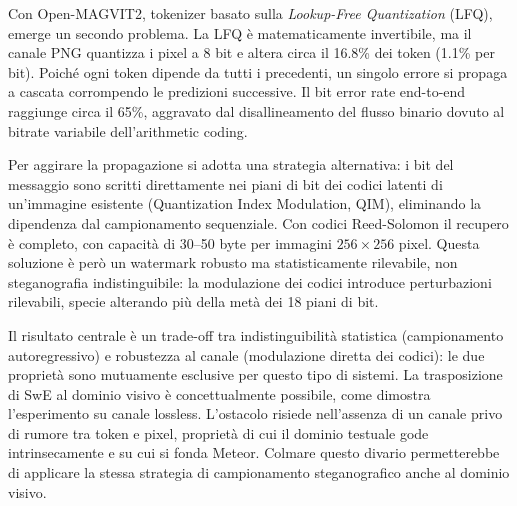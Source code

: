 \documentclass[a4paper, 11pt]{article}
\begin{document}
Con Open-MAGVIT2, tokenizer basato sulla \emph{Lookup-Free Quantization} (LFQ), emerge un secondo problema. La LFQ è matematicamente invertibile, ma il canale PNG quantizza i pixel a 8 bit e altera circa il 16.8\% dei token (1.1\% per bit). Poiché ogni token dipende da tutti i precedenti, un singolo errore si propaga a cascata corrompendo le predizioni successive. Il bit error rate end-to-end raggiunge circa il 65\%, aggravato dal disallineamento del flusso binario dovuto al bitrate variabile dell'arithmetic coding.

Per aggirare la propagazione si adotta una strategia alternativa: i bit del messaggio sono scritti direttamente nei piani di bit dei codici latenti di un'immagine esistente (Quantization Index Modulation, QIM), eliminando la dipendenza dal campionamento sequenziale. Con codici Reed-Solomon il recupero è completo, con capacità di 30--50 byte per immagini $256\times 256$ pixel. Questa soluzione è però un watermark robusto ma statisticamente rilevabile, non steganografia indistinguibile: la modulazione dei codici introduce perturbazioni rilevabili, specie alterando più della metà dei 18 piani di bit.

Il risultato centrale è un trade-off tra indistinguibilità statistica (campionamento autoregressivo) e robustezza al canale (modulazione diretta dei codici): le due proprietà sono mutuamente esclusive per questo tipo di sistemi. La trasposizione di SwE al dominio visivo è concettualmente possibile, come dimostra l'esperimento su canale lossless. L'ostacolo risiede nell'assenza di un canale privo di rumore tra token e pixel, proprietà di cui il dominio testuale gode intrinsecamente e su cui si fonda Meteor. Colmare questo divario permetterebbe di applicare la stessa strategia di campionamento steganografico anche al dominio visivo.
\end{document}
